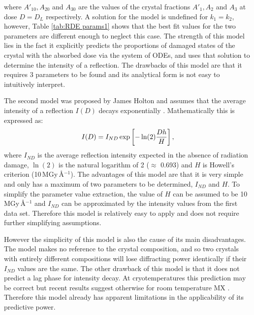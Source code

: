 where $A'_{10}, A_{20}$ and $A_{30}$ are the values of the crystal fractions $A'_{1}, A_{2}$ and $A_{3}$ at dose $D = D_L$ respectively.
A solution for the model is undefined for $k_1 = k_2$, however, Table \ref{tab:RDE params1} shows that the best fit values for the two parameters are different enough to neglect this case. \newline
The strength of this model lies in the fact it explicitly predicts the proportions of damaged states of the crystal with the absorbed dose via the system of ODEs, and uses that solution to determine the intensity of a reflection.
The drawbacks of this model are that it requires 3 parameters to be found and its analytical form is not easy to intuitively interpret.

The second model was proposed by James Holton and assumes that the average intensity of a reflection $I(D)$ decays exponentially \cite{holton2010}. Mathematically this is expressed as:
\begin{equation}
I(D) = I_{ND} \exp \left[ -\ln(2) \frac{Dh}{H} \right],
\label{eq:Holton DDM}
\end{equation}
where $I_{ND}$ is the average reflection intensity expected in the absence of radiation damage, $\ln(\text{2})$ is the natural logarithm of 2 ($\approx$ 0.693) and $H$ is Howell's criterion (10$\, $MGy$\,$\AA$^{-1}$).
The advantages of this model are that it is very simple and only has a maximum of two parameters to be determined, $I_{ND}$ and $H$.
To simplify the parameter value extraction, the value of $H$ can be assumed to be 10$\,$MGy$\,$\AA$^{-\text{1}}$ and $I_{ND}$ can be approximated by the intensity values from the first data set.
Therefore this model is relatively easy to apply and does not require further simplifying assumptions.

However the simplicity of this model is also the cause of its main disadvantages.
The model makes no reference to the crystal composition, and so two crystals with entirely different compositions will lose diffracting power identically if their $I_{ND}$ values are the same.
\newline
The other drawback of this model is that it does not predict a lag phase for intensity decay.
At cryotemperatures this prediction may be correct but recent results suggest otherwise for room temperature MX \cite{owen2014}.
Therefore this model already has apparent limitations in the applicability of its predictive power.

